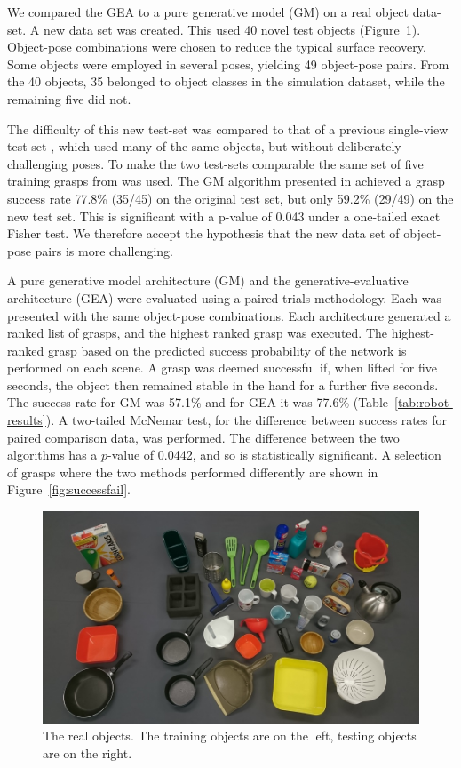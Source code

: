 We compared the GEA to a pure generative model (GM) on a real object data-set. A new data set was created. This used 40 novel test objects (Figure~\ref{fig:real-objects}). Object-pose combinations were chosen to reduce the typical surface recovery. Some objects were employed in several poses, yielding 49 object-pose pairs. From the 40 objects, 35 belonged to object classes in the simulation dataset, while the remaining five did not. 

The difficulty of this new test-set was compared to that of a previous single-view test set \cite{kopicki2015ijrr}, which used many of the same objects, but without deliberately challenging poses. To make the two test-sets comparable the same set of five training grasps from \cite{kopicki2015ijrr} was used. The GM algorithm presented in \cite{kopicki2015ijrr} achieved a grasp success rate 77.8\% (35/45) on the original test set, but only 59.2\% (29/49) on the new test set. This is significant with a p-value of 0.043 under a one-tailed exact Fisher test. We therefore accept the hypothesis that the new data set of object-pose pairs is more challenging.

A pure generative model architecture (GM) and the generative-evaluative architecture (GEA) were evaluated using a paired trials methodology. Each was presented with the same object-pose combinations. Each architecture generated a ranked list of grasps, and the highest ranked grasp was executed. The highest-ranked grasp based on the predicted success probability of the network is performed on each scene. A grasp was deemed successful if, when lifted for five seconds, the object then remained stable in the hand for a further five seconds. The success rate for GM was 57.1\% and for GEA it was 77.6\% (Table~\ref{tab:robot-results}). A two-tailed McNemar test, for the difference between success rates for paired comparison data, was performed. The difference between the two algorithms has a $p$-value of 0.0442, and so is statistically significant. A selection of grasps where the two methods performed differently are shown in Figure~\ref{fig:successfail}.

\begin{figure}
\begin{center}
  \includegraphics[width=0.9\linewidth]{images/objects.jpg}
  \end{center}
  \caption{The real objects. The training objects are on the left, testing objects are on the right.}
  \label{fig:real-objects}
\end{figure}

